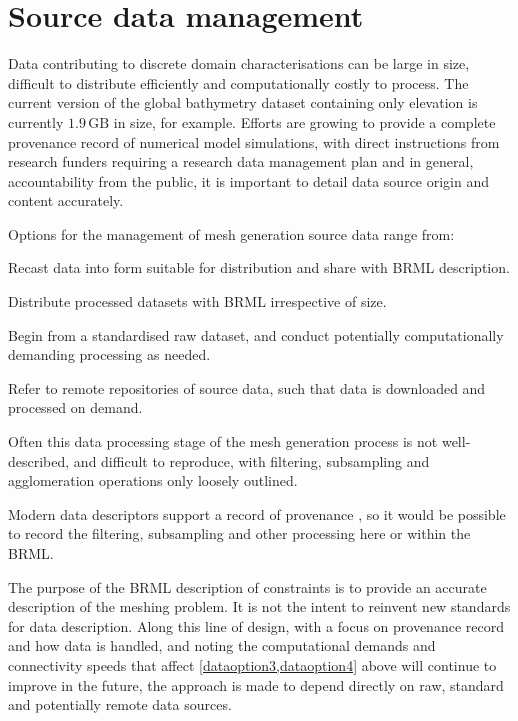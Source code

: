 \documentclass[a4paper, 10pt]{book}
\providecommand{\brml}{BRML\xspace}
\begin{document}
\chapter{Source data management}
\label{sec:data}
%
%
Data contributing to discrete domain characterisations
can be large in size, difficult to distribute efficiently and computationally costly to process.
%
The current version of the global bathymetry dataset \cite{gebco} containing only elevation is currently
$1.9\, \textrm{GB}$
in size, for example.
%
Efforts are growing to provide a complete provenance record of numerical model simulations,
with direct instructions from research funders requiring a research data management plan
\citep{nwodmp}
and in general, accountability from the public,
it is important to detail data source origin and content accurately.

Options for the management of mesh generation source data range from:
%
\begin{optionenum}
\setlength{\itemsep}{1pt}\setlength{\parskip}{0pt}\setlength{\parsep}{0pt}
\item Recast data into form suitable for distribution and share with \brml description.
\item Distribute processed datasets with \brml irrespective of size.
\item \label{dataoption3} Begin from a standardised raw dataset, and conduct potentially computationally demanding processing as needed.
\item \label{dataoption4} Refer to remote repositories of source data, such that data is downloaded and processed on demand.
\end{optionenum}

Often this data processing stage of the mesh generation process is not well-described, and difficult to reproduce,
with filtering, subsampling and agglomeration operations only loosely outlined.

Modern data descriptors support a record of provenance \citep[such as the `history' field embedded in NetCDF,][]{netcdf},
so it would be possible to record the filtering, subsampling and other processing here or within the \brml.

The purpose of the \brml description of constraints
is to provide an accurate description of the meshing problem.
%
It is not the intent to reinvent new standards for data description.
%
Along this line of design,
with a focus on provenance record and how data is handled,
and noting the computational demands and connectivity speeds that affect \cref{dataoption3,dataoption4} above will continue to improve in the future,
the approach is made to depend directly on raw, standard and potentially remote data sources.
\end{document}
